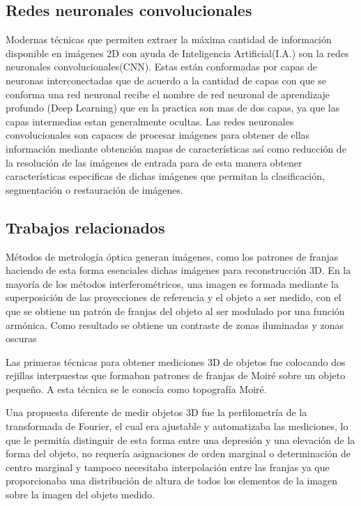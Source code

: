 \documentclass[10pt,letterpaper]{article}
\begin{document}
\subsection{Redes neuronales convolucionales}
Modernas técnicas que permiten extraer la máxima cantidad de información disponible en imágenes 2D con ayuda de Inteligencia Artificial(I.A.) son la redes neuronales convolucionales(CNN). Estas están conformadas por capas de neuronas interconectadas que de acuerdo a la cantidad de capas con que se conforma una red neuronal recibe el nombre de red neuronal de aprendizaje profundo (Deep Learning) que en la practica son mas de dos capas, ya que las capas intermedias estan generalmente ocultas. Las redes neuronales convolucionales son capaces de procesar imágenes para obtener de ellas información mediante obtención mapas de características así como reducción de la resolución de las imágenes de entrada para de esta manera obtener características especificas de dichas imágenes que permitan la clasificación, segmentación o restauración de imágenes.

\subsection{Trabajos relacionados}
Métodos de metrología óptica generan imágenes, como los patrones de franjas haciendo de esta forma esenciales dichas imágenes para reconstrucción 3D. En la mayoría de los métodos interferométricos, una imagen es formada mediante la superposición de las proyecciones de referencia y el objeto a ser medido, con el que se obtiene un patrón de franjas del objeto al ser modulado por una función armónica. Como resultado se obtiene un contraste de zonas iluminadas y zonas oscuras

Las primeras técnicas para obtener mediciones 3D de objetos fue colocando dos rejillas interpuestas que formaban patrones de franjas de Moiré sobre un objeto pequeño. A esta técnica se le conocía como topografía Moiré\cite{Ides:Yata}. %

Una propuesta diferente de medir objetos 3D fue la perfilometría de la transformada de Fourier, el cual era ajustable y automatizaba las mediciones, lo que le permitía distinguir de esta forma entre una depresión y una elevación de la forma del objeto, no requería asignaciones de orden marginal o determinación de centro marginal y tampoco necesitaba interpolación entre las franjas ya que proporcionaba una distribución de altura de todos los elementos de la imagen sobre la imagen del objeto medido\cite{Take:Muto}. %
\end{document}
